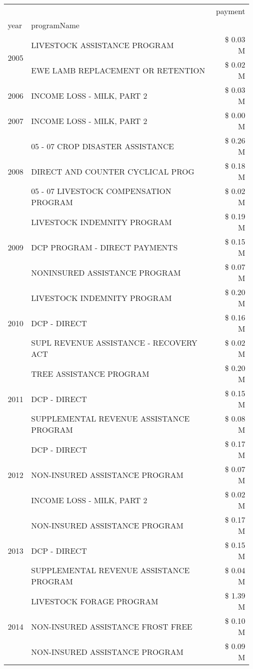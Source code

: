 \begin{tabular}{llr}
\toprule
 &  & payment \\
year & programName &  \\
\midrule
\multirow[t]{2}{*}{2005} & LIVESTOCK ASSISTANCE PROGRAM & \$ 0.03 M \\
 & EWE LAMB REPLACEMENT OR RETENTION & \$ 0.02 M \\
\cline{1-3}
2006 & INCOME LOSS - MILK, PART 2 & \$ 0.03 M \\
\cline{1-3}
2007 & INCOME LOSS - MILK, PART 2 & \$ 0.00 M \\
\cline{1-3}
\multirow[t]{3}{*}{2008} & 05 - 07 CROP DISASTER ASSISTANCE & \$ 0.26 M \\
 & DIRECT AND COUNTER CYCLICAL PROG & \$ 0.18 M \\
 & 05 - 07 LIVESTOCK COMPENSATION PROGRAM & \$ 0.02 M \\
\cline{1-3}
\multirow[t]{3}{*}{2009} & LIVESTOCK INDEMNITY PROGRAM & \$ 0.19 M \\
 & DCP PROGRAM - DIRECT PAYMENTS & \$ 0.15 M \\
 & NONINSURED ASSISTANCE PROGRAM & \$ 0.07 M \\
\cline{1-3}
\multirow[t]{3}{*}{2010} & LIVESTOCK INDEMNITY PROGRAM & \$ 0.20 M \\
 & DCP - DIRECT & \$ 0.16 M \\
 & SUPL REVENUE ASSISTANCE - RECOVERY ACT & \$ 0.02 M \\
\cline{1-3}
\multirow[t]{3}{*}{2011} & TREE ASSISTANCE PROGRAM & \$ 0.20 M \\
 & DCP - DIRECT & \$ 0.15 M \\
 & SUPPLEMENTAL REVENUE ASSISTANCE PROGRAM & \$ 0.08 M \\
\cline{1-3}
\multirow[t]{3}{*}{2012} & DCP - DIRECT & \$ 0.17 M \\
 & NON-INSURED ASSISTANCE PROGRAM & \$ 0.07 M \\
 & INCOME LOSS - MILK, PART 2 & \$ 0.02 M \\
\cline{1-3}
\multirow[t]{3}{*}{2013} & NON-INSURED ASSISTANCE PROGRAM & \$ 0.17 M \\
 & DCP - DIRECT & \$ 0.15 M \\
 & SUPPLEMENTAL REVENUE ASSISTANCE PROGRAM & \$ 0.04 M \\
\cline{1-3}
\multirow[t]{3}{*}{2014} & LIVESTOCK FORAGE PROGRAM & \$ 1.39 M \\
 & NON-INSURED ASSISTANCE FROST FREE & \$ 0.10 M \\
 & NON-INSURED ASSISTANCE PROGRAM & \$ 0.09 M \\

\end{tabular}
